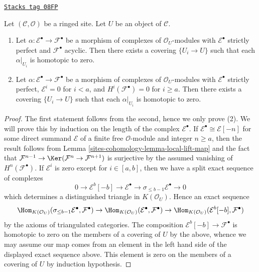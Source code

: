 \begin{lemma}
\label{sites-cohomology-lemma-local-homotopy}
\href{https://stacks.math.columbia.edu/tag/08FP}{\texttt{Stacks tag 08FP}}

Let $(\mathcal{C}, \mathcal{O})$ be a ringed site. Let $U$ be an object
of $\mathcal{C}$.
\begin{enumerate}
\item Let $\alpha : \mathcal{E}^\bullet \to \mathcal{F}^\bullet$
be a morphism of complexes of $\mathcal{O}_U$-modules
with $\mathcal{E}^\bullet$ strictly perfect and $\mathcal{F}^\bullet$
acyclic. Then there exists a covering $\{U_i \to U\}$ such that each
$\alpha|_{U_i}$ is homotopic to zero.
\item Let $\alpha : \mathcal{E}^\bullet \to \mathcal{F}^\bullet$
be a morphism of complexes of $\mathcal{O}_U$-modules
with $\mathcal{E}^\bullet$ strictly perfect, $\mathcal{E}^i = 0$
for $i < a$, and $H^i(\mathcal{F}^\bullet) = 0$ for $i \geq a$.
Then there exists a covering $\{U_i \to U\}$ such that each
$\alpha|_{U_i}$ is homotopic to zero.
\end{enumerate}
\end{lemma}

\begin{proof}
The first statement follows from the second, hence we only prove (2).
We will prove this by induction on the length of the complex
$\mathcal{E}^\bullet$. If $\mathcal{E}^\bullet \cong \mathcal{E}[-n]$
for some direct summand $\mathcal{E}$ of a finite free
$\mathcal{O}$-module and integer $n \geq a$, then the result follows from
Lemma \ref{sites-cohomology-lemma-local-lift-map} and the fact that
$\mathcal{F}^{n - 1} \to \Ker(\mathcal{F}^n \to \mathcal{F}^{n + 1})$
is surjective by the assumed vanishing of $H^n(\mathcal{F}^\bullet)$.
If $\mathcal{E}^i$ is zero except for $i \in [a, b]$, then we have a
split exact sequence of complexes
$$
0 \to \mathcal{E}^b[-b] \to \mathcal{E}^\bullet \to
\sigma_{\leq b - 1}\mathcal{E}^\bullet \to 0
$$
which determines a distinguished triangle in
$K(\mathcal{O}_U)$. Hence an exact sequence
$$
\Hom_{K(\mathcal{O}_U)}(
\sigma_{\leq b - 1}\mathcal{E}^\bullet, \mathcal{F}^\bullet)
\to
\Hom_{K(\mathcal{O}_U)}(\mathcal{E}^\bullet, \mathcal{F}^\bullet)
\to
\Hom_{K(\mathcal{O}_U)}(\mathcal{E}^b[-b], \mathcal{F}^\bullet)
$$
by the axioms of triangulated categories. The composition
$\mathcal{E}^b[-b] \to \mathcal{F}^\bullet$ is homotopic to zero
on the members of a covering of $U$ by the above,
whence we may assume our map comes from an element in the
left hand side of the displayed exact sequence above. This element
is zero on the members of a covering of $U$ by induction hypothesis.
\end{proof}

